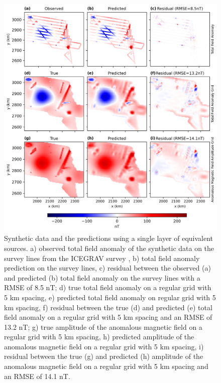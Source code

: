 \begin{figure}[tb!]
\centering
\includegraphics[width=1\linewidth]{figures/single_layer_synthetic.png}
\caption{
    Synthetic data and the predictions using a single layer of equivalent sources. a) observed total field anomaly of the synthetic data on the survey lines from the ICEGRAV survey \citep{ICEGRAV_data}, b) total field anomaly prediction on the survey lines, c) residual between the observed (a) and predicted (b) total field anomaly on the survey lines with a RMSE of 8.5 nT; d) true total field anomaly on a regular grid with 5 km spacing, e) predicted total field anomaly on regular grid with 5 km spacing, f) residual between the true (d) and predicted (e) total field anomaly on a regular grid with 5 km spacing and an RMSE of 13.2 nT; g) true amplitude of the anomalous magnetic field on a regular grid with 5 km spacing, h) predicted amplitude of the anomalous magnetic field on a regular grid with 5 km spacing, i) residual between the true (g) and predicted (h) amplitude of the anomalous magnetic field on a regular grid with 5 km spacing and an RMSE of 14.1 nT.
}
\label{fig:single_layer_synthetic}
\end{figure}

